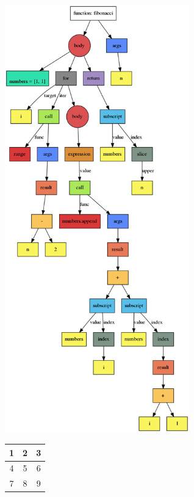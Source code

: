 \documentclass{letter}
\begin{document}
	\includegraphics[width=80mm]{artifacts/tree.png}

    \begin{center}
        \begin{tabular}{ |c|c|c| }
            \hline
            1 & 2 & 3 \\ 
			\hline 
			4 & 5 & 6 \\ 
			\hline 
			7 & 8 & 9 \\
            \hline
        \end{tabular}
    \end{center}
    
\end{document}
